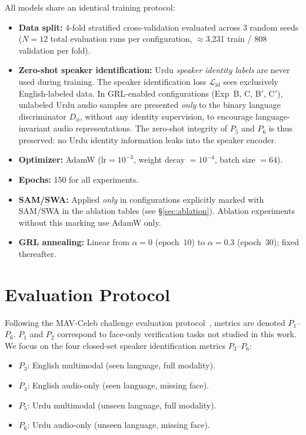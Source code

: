 \documentclass[conference]{IEEEtran}
\begin{document}
All models share an identical training protocol:
\begin{itemize}
    \item \textbf{Data split:} 4-fold stratified cross-validation evaluated across 3 random seeds ($N=12$ total evaluation runs per configuration, $\approx$3,231 train / 808 validation per fold).
    \item \textbf{Zero-shot speaker identification:} Urdu \textit{speaker identity
    labels} are never used during training. The speaker identification loss
    $\mathcal{L}_{\text{id}}$ sees exclusively English-labeled data.
    In GRL-enabled configurations (Exp~B, C, B$'$, C$'$), unlabeled Urdu audio
    samples are presented \textit{only} to the binary language discriminator
    $D_\phi$, without any identity supervision, to encourage language-invariant
    audio representations. The zero-shot integrity of $P_5$ and $P_6$ is
    thus preserved: no Urdu identity information leaks into the speaker encoder.
    \item \textbf{Optimizer:} AdamW ($\text{lr}=10^{-3}$, weight decay $=10^{-4}$,
    batch size $=64$).
    \item \textbf{Epochs:} 150 for all experiments.
    \item \textbf{SAM/SWA:} Applied \textit{only} in configurations explicitly
    marked with SAM/SWA in the ablation tables (see \S\ref{sec:ablation}).
    Ablation experiments without this marking use AdamW only.
    \item \textbf{GRL annealing:} Linear from $\alpha=0$ (epoch~10) to
    $\alpha=0.3$ (epoch~30); fixed thereafter.
\end{itemize}

\section{Evaluation Protocol}
\label{sec:eval_protocol}

Following the MAV-Celeb challenge evaluation protocol~\cite{poly2026challenge},
metrics are denoted $P_1$--$P_6$. $P_1$ and $P_2$ correspond to face-only
verification tasks not studied in this work. We focus on the four closed-set
speaker identification metrics $P_3$--$P_6$:

\begin{itemize}
    \item $P_3$: English multimodal (seen language, full modality).
    \item $P_4$: English audio-only (seen language, missing face).
    \item $P_5$: Urdu multimodal (unseen language, full modality).
    \item $P_6$: Urdu audio-only (unseen language, missing face).
\end{itemize}
\end{document}
